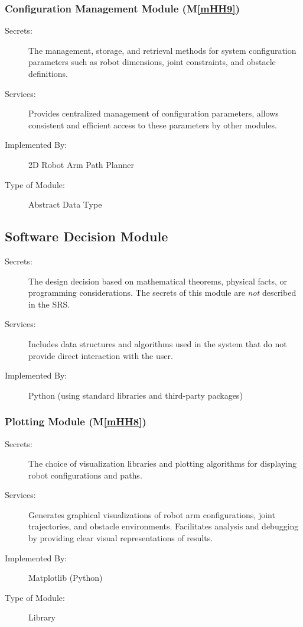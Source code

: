 \documentclass[12pt, titlepage]{article}
\newcommand{\mref}[1]{M\ref{#1}}
\begin{document}
\subsubsection{Configuration Management Module (\mref{mHH9})}

\begin{description}
\item[Secrets:] The management, storage, and retrieval methods for system configuration parameters such as robot dimensions, joint constraints, and obstacle definitions.
\item[Services:] Provides centralized management of configuration parameters, allows consistent and efficient access to these parameters by other modules.
\item[Implemented By:] 2D Robot Arm Path Planner
\item[Type of Module:] Abstract Data Type
\end{description}




\subsection{Software Decision Module}

\begin{description}
\item[Secrets:] The design decision based on mathematical theorems, physical facts, or programming considerations. The secrets of this module are \emph{not} described in the SRS.
\item[Services:] Includes data structures and algorithms used in the system that do not provide direct interaction with the user.
\item[Implemented By:] Python (using standard libraries and third-party packages)
\end{description}

\subsubsection{Plotting Module (\mref{mHH8})}

\begin{description}
\item[Secrets:] The choice of visualization libraries and plotting algorithms for displaying robot configurations and paths.
\item[Services:] Generates graphical visualizations of robot arm configurations, joint trajectories, and obstacle environments. Facilitates analysis and debugging by providing clear visual representations of results.
\item[Implemented By:] Matplotlib (Python)
\item[Type of Module:] Library
\end{description}
\end{document}
